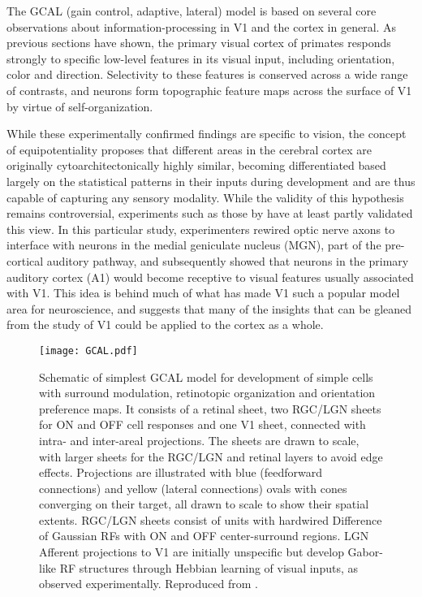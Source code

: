 The GCAL (gain control, adaptive, lateral) model is based on several
core observations about information-processing in V1 and the cortex in
general. As previous sections have shown, the primary visual cortex of
primates responds strongly to specific low-level features in its
visual input, including orientation, color and direction. Selectivity
to these features is conserved across a wide range of contrasts, and
neurons form topographic feature maps across the surface of V1 by
virtue of self-organization.

While these experimentally confirmed
findings are specific to vision, the concept of equipotentiality
proposes that different areas in the cerebral cortex are originally
cytoarchitectonically highly similar, becoming differentiated based
largely on the statistical patterns in their inputs during development
and are thus capable of capturing any sensory modality. While the
validity of this hypothesis remains controversial, experiments such as
those by \cite{Sur1990} have at least partly validated this view. In
this particular study, experimenters rewired optic nerve axons to
interface with neurons in the medial geniculate nucleus (MGN), part of
the pre-cortical auditory pathway, and subsequently showed that
neurons in the primary auditory cortex (A1) would become receptive to
visual features usually associated with V1. This idea is behind much of what
has made V1 such a popular model area for neuroscience, and suggests
that many of the insights that can be gleaned from the study of V1
could be applied to the cortex as a whole.

\begin{figure}
	\centering \texttt{[image: GCAL.pdf]}
	\caption[Schematic representation of the GCAL model. Reproduced
      from \cite{Stevens2013}.]{Schematic of simplest GCAL model for
      development of simple cells with surround modulation,
      retinotopic organization and orientation preference maps. It
      consists of a retinal sheet, two RGC/LGN sheets for ON and OFF cell
      responses and one V1 sheet, connected with intra- and
      inter-areal projections. The sheets are drawn to scale, with
      larger sheets for the RGC/LGN and retinal layers to avoid edge
      effects. Projections are illustrated with blue (feedforward
      connections) and yellow (lateral connections) ovals with cones
      converging on their target, all drawn to scale to show their
      spatial extents. RGC/LGN sheets consist of units with hardwired
      Difference of Gaussian RFs with ON and OFF center-surround
      regions. LGN Afferent projections to V1 are initially unspecific
      but develop Gabor-like RF structures through Hebbian learning of
      visual inputs, as observed experimentally. Reproduced from
      \cite{Stevens2013}.}
	\label{GCAL}
\end{figure}

